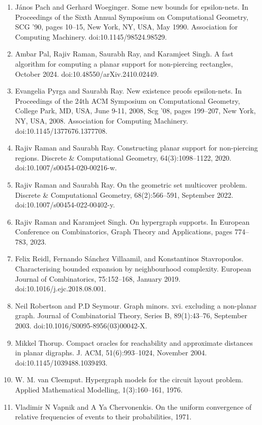 \begin{enumerate}
\item[]  [51]  János Pach and Gerhard Woeginger.  Some new bounds for epsilon-nets.  In Proceedings of the Sixth Annual Symposium on Computational Geometry, SCG ’90, pages 10–15, New York, NY, USA, May 1990. Association for Computing Machinery.  doi:10.1145/98524.98529.  
\item[]  [52]  Ambar Pal, Rajiv Raman, Saurabh Ray, and Karamjeet Singh.  A fast algorithm for computing a planar support for non-piercing rectangles, October 2024.  doi:10.48550/arXiv.2410.02449.  
\item[]  [53]  Evangelia Pyrga and Saurabh Ray.  New existence proofs epsilon-nets.  In Proceedings of the 24th ACM Symposium on Computational Geometry, College Park, MD, USA, June 9-11, 2008, Scg ’08, pages 199–207, New York, NY, USA, 2008. Association for Computing Machinery.  doi:10.1145/1377676.1377708.  
\item[]  [54]  Rajiv Raman and Saurabh Ray.  Constructing planar support for non-piercing regions.  Discrete \& Computational Geometry, 64(3):1098–1122, 2020.  doi:10.1007/s00454-020-00216-w.  
\item[]  [55]  Rajiv Raman and Saurabh Ray.  On the geometric set multicover problem.  Discrete \& Computational Geometry, 68(2):566–591, September 2022.  doi:10.1007/s00454-022-00402-y.  
\item[]  [56]  Rajiv Raman and Karamjeet Singh.  On hypergraph supports.  In European Conference on Combinatorics, Graph Theory and Applications, pages 774–783, 2023.  
\item[]  [57]  Felix Reidl, Fernando Sánchez Villaamil, and Konstantinos Stavropoulos.  Characterising bounded expansion by neighbourhood complexity.  European Journal of Combinatorics, 75:152–168, January 2019.  doi:10.1016/j.ejc.2018.08.001.  
\item[]  [58]  Neil Robertson and P.D Seymour.  Graph minors. xvi. excluding a non-planar graph.  Journal of Combinatorial Theory, Series B, 89(1):43–76, September 2003.  doi:10.1016/S0095-8956(03)00042-X.  
\item[]  [59]  Mikkel Thorup.  Compact oracles for reachability and approximate distances in planar digraphs.  J. ACM, 51(6):993–1024, November 2004.  doi:10.1145/1039488.1039493.  
\item[]  [60]  W. M. van Cleemput.  Hypergraph models for the circuit layout problem.  Applied Mathematical Modelling, 1(3):160–161, 1976.  
\item[]  [61]  Vladimir N Vapnik and A Ya Chervonenkis.  On the uniform convergence of relative frequencies of events to their probabilities, 1971.  

\end{enumerate}
